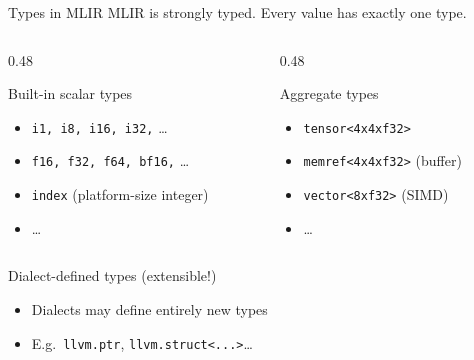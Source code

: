 \begin{frame}{Types in MLIR}
  MLIR is strongly typed. Every value has exactly one type.

  \medskip
  \begin{columns}
    \begin{column}{0.48\textwidth}
      \begin{block}{Built-in scalar types}
        \begin{itemize}
          \item \texttt{i1, i8, i16, i32,} \ldots
          \item \texttt{f16, f32, f64, bf16,} \ldots
          \item \texttt{index} {\small(platform-size integer)}
          \item \ldots
        \end{itemize}
      \end{block}
    \end{column}
    \begin{column}{0.48\textwidth}
      \begin{exampleblock}{Aggregate types}
        \begin{itemize}
          \item \texttt{tensor<4x4xf32>}
          \item \texttt{memref<4x4xf32>} {\small(buffer)}
          \item \texttt{vector<8xf32>} {\small(SIMD)}
          \item \ldots
        \end{itemize}
      \end{exampleblock}
    \end{column}
  \end{columns}

  \medskip
  \begin{block}{Dialect-defined types \hfill (extensible!)}
    \begin{itemize}
      \item Dialects may define entirely new types
      \item E.g.\ \texttt{llvm.ptr}, \texttt{llvm.struct<...>}\ldots
    \end{itemize}
  \end{block}
\end{frame}


